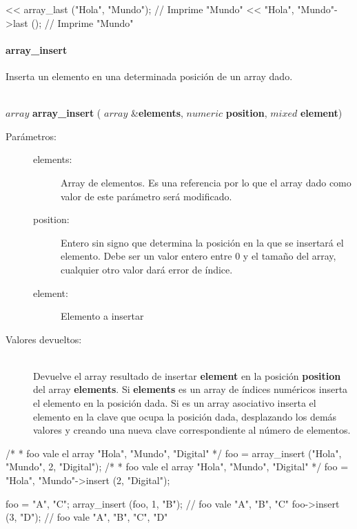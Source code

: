 \begin{myverbatim}   
   << array_last ({"Hola", "Mundo"}); // Imprime "Mundo"
   << {"Hola", "Mundo"}->last (); // Imprime "Mundo"
\end{myverbatim}

\paragraph{array\_insert}
Inserta un elemento en una determinada posición de un array dado.

\begin{framed}
\hfill \\ $array$ \textbf{array\_insert} ( $array$ \&\textbf{elements}, $numeric$ \textbf{position}, $mixed$ \textbf{element})  
\begin{description}
\item [Parámetros:] \hfill 
   \begin{description}
   \item[elements:] Array de elementos. Es una referencia por lo que el array dado como valor de este parámetro será modificado. 
   \item[position:] Entero sin signo que determina la posición en la que se insertará el elemento. Debe ser un valor entero entre $0$ y
   el tamaño del array, cualquier otro valor dará error de índice.
   \item[element:] Elemento a insertar
   \end{description}
\item[Valores devueltos:] \hfill \\
   Devuelve el array resultado de insertar \textbf{element} en la posición \textbf{position} del array \textbf{elements}.
   Si \textbf{elements} es un array de índices numéricos inserta el elemento en la posición dada. Si 
   es un array asociativo inserta el elemento en la clave que ocupa la posición dada, desplazando los demás valores y creando
   una nueva clave correspondiente al número de elementos.
\end{description}
\end{framed}
     
\begin{myverbatim}   
   /*
    * foo vale el array { "Hola", "Mundo", "Digital"}
    */
   foo = array_insert ({"Hola", "Mundo"}, 2, "Digital"); 
   /*
    * foo vale el array { "Hola", "Mundo", "Digital"}
    */
   foo = {"Hola", "Mundo"}->insert (2, "Digital");
   
   foo = {"A", "C"};
   array_insert (foo, 1, "B"); // foo vale {"A", "B", "C"}
   foo->insert (3, "D"); // foo vale {"A", "B", "C", "D"}
\end{myverbatim}

